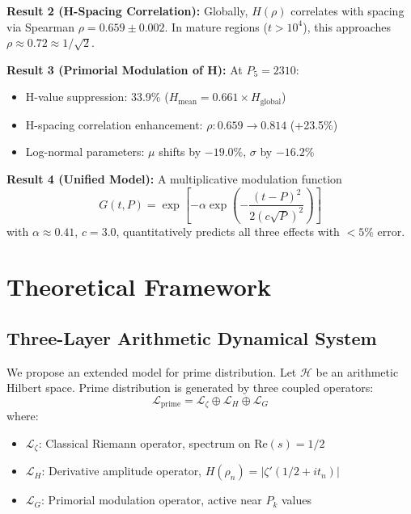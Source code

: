 \documentclass[12pt]{article}
\begin{document}
\textbf{Result 2 (H-Spacing Correlation):} Globally, $H(\rho)$
correlates with spacing via Spearman $\rho = 0.659 \pm 0.002$. In
mature regions ($t > 10^4$), this approaches $\rho \approx 0.72 \approx 1/\sqrt{2}$.

\textbf{Result 3 (Primorial Modulation of H):} At $P_5 = 2310$:

\begin{itemize}
\item H-value suppression: 33.9\% ($H_{\text{mean}} = 0.661 \times H_{\text{global}}$)

\item H-spacing correlation enhancement: $\rho\colon 0.659 \to 0.814$ (+23.5\%)

\item Log-normal parameters: $\mu$ shifts by $-19.0\%$, $\sigma$ by $-16.2\%$
\end{itemize}

\textbf{Result 4 (Unified Model):} A multiplicative modulation function
%
\begin{equation}
G(t, P) = \exp\left[-\alpha \exp\left(-\frac{(t-P)^2}{2(c\sqrt{P})^2}\right)\right]
\end{equation}
%
with $\alpha \approx 0.41$, $c = 3.0$, quantitatively predicts all
three effects with $<5\%$ error.

\section{Theoretical Framework}

\subsection{Three-Layer Arithmetic Dynamical System}

We propose an extended model for prime distribution. Let
$\mathcal{H}$ be an arithmetic Hilbert space. Prime distribution is
generated by three coupled operators:
%
\begin{equation}
\mathcal{L}_{\text{prime}} = \mathcal{L}_{\zeta} \oplus
\mathcal{L}_H \oplus \mathcal{L}_G
\end{equation}
%
where:

\begin{itemize}
\item $\mathcal{L}_{\zeta}$: Classical Riemann operator, spectrum on $\text{Re}(s) = 1/2$

\item $\mathcal{L}_H$: Derivative amplitude operator, $H(\rho_n) = |\zeta'(1/2 + it_n)|$

\item $\mathcal{L}_G$: Primorial modulation operator, active near $P_k$ values
\end{itemize}
\end{document}
